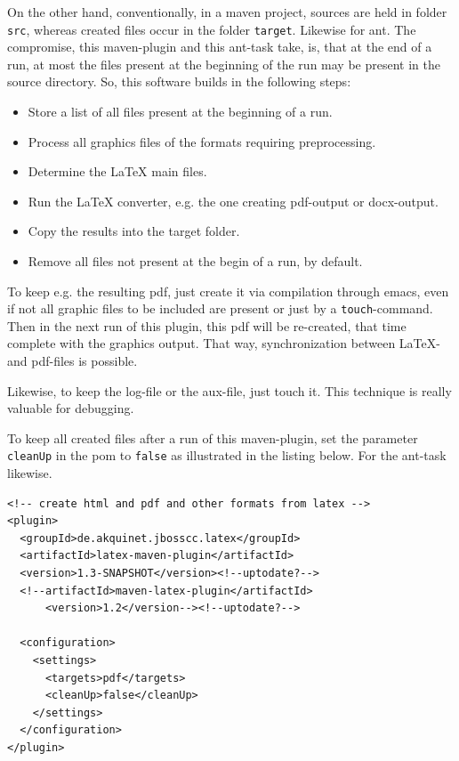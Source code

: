 \documentclass[12pt]{article}
\begin{document}
On the other hand, 
conventionally, in a maven project, 
sources are held in folder {\tt src}, 
whereas created files occur in the folder {\tt target}. 
Likewise for ant. 
The compromise, this maven-plugin and this ant-task take, 
is, that at the end of a run, 
at most the files present at the beginning of the run 
may be present in the source directory. 
So, this software builds in the following steps: 
%
\begin{itemize}
\item
Store a list of all files present at the beginning of a run.
\item
Process all graphics files of the formats requiring preprocessing.
\item
Determine the \LaTeX{} main files.
\item
Run the \LaTeX{} converter, e.g. the one creating pdf-output or docx-output.
\item
Copy the results into the target folder.
\item
Remove all files not present at the begin of a run, by default. 
\end{itemize}

To keep e.g. the resulting pdf, 
just create it via compilation through emacs, 
even if not all graphic files to be included are present 
or just by a {\tt touch}-command. 
Then in the next run of this plugin, 
this pdf will be re-created, 
that time complete with the graphics output. 
That way, synchronization between \LaTeX- and pdf-files is possible. 

Likewise, to keep the log-file or the aux-file, just touch it. 
This technique is really valuable for debugging. 

To keep all created files after a run of this maven-plugin, 
set the parameter {\tt cleanUp} in the pom 
to {\tt false} as illustrated in the listing below. 
For the ant-task likewise. 
%
\lstset{language=xml, basicstyle=\small}
\begin{lstlisting}
<!-- create html and pdf and other formats from latex -->
<plugin>
  <groupId>de.akquinet.jbosscc.latex</groupId>
  <artifactId>latex-maven-plugin</artifactId>
  <version>1.3-SNAPSHOT</version><!--uptodate?-->
  <!--artifactId>maven-latex-plugin</artifactId>
      <version>1.2</version--><!--uptodate?-->
	
  <configuration>
    <settings>
      <targets>pdf</targets>
      <cleanUp>false</cleanUp>
    </settings>
  </configuration>
</plugin>
\end{lstlisting}
\end{document}
